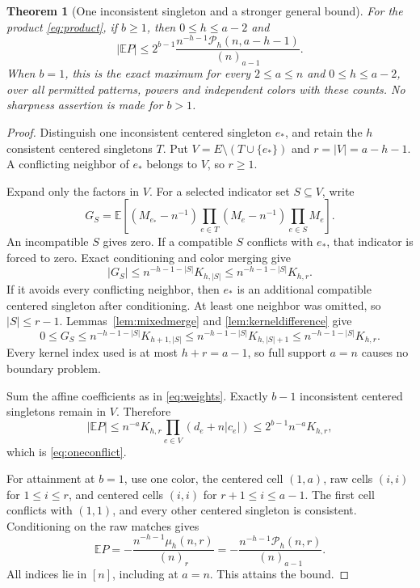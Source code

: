 \documentclass[11pt]{article}
\newtheorem{theorem}{Theorem}[section]
\theoremstyle{definition}
\theoremstyle{remark}
\newcommand{\E}{\mathbb E}
\newcommand{\1}{\mathbf 1}
\begin{document}
\begin{theorem}[One inconsistent singleton and a stronger general bound]\label{thm:oneconflict}
For the product \eqref{eq:product}, if $b\ge1$, then $0\le h\le a-2$ and
\begin{equation}\label{eq:oneconflict}
|\E P|\le
2^{b-1}\frac{n^{-h-1}\mathcal P_h(n,a-h-1)}{(n)_{a-1}}.
\end{equation}
When $b=1$, this is the exact maximum for every $2\le a\le n$ and $0\le h\le a-2$, over all permitted patterns, powers and independent colors with these counts. No sharpness assertion is made for $b>1$.
\end{theorem}
\begin{proof}
Distinguish one inconsistent centered singleton $e_*$, and retain the $h$ consistent centered singletons $T$. Put $V=E\setminus(T\cup\{e_*\})$ and $r=|V|=a-h-1$. A conflicting neighbor of $e_*$ belongs to $V$, so $r\ge1$.

Expand only the factors in $V$. For a selected indicator set $S\subseteq V$, write
\[
G_S=\E\left[(M_{e_*}-n^{-1})
\prod_{e\in T}(M_e-n^{-1})\prod_{e\in S}M_e\right].
\]
An incompatible $S$ gives zero. If a compatible $S$ conflicts with $e_*$, that indicator is forced to zero. Exact conditioning and color merging give
\[
|G_S|\le n^{-h-1-|S|}K_{h,|S|}\le n^{-h-1-|S|}K_{h,r}.
\]
If it avoids every conflicting neighbor, then $e_*$ is an additional compatible centered singleton after conditioning. At least one neighbor was omitted, so $|S|\le r-1$. Lemmas~\ref{lem:mixedmerge} and \ref{lem:kerneldifference} give
\[
0\le G_S\le n^{-h-1-|S|}K_{h+1,|S|}
\le n^{-h-1-|S|}K_{h,|S|+1}
\le n^{-h-1-|S|}K_{h,r}.
\]
Every kernel index used is at most $h+r=a-1$, so full support $a=n$ causes no boundary problem.

Sum the affine coefficients as in \eqref{eq:weights}. Exactly $b-1$ inconsistent centered singletons remain in $V$. Therefore
\[
|\E P|\le n^{-a}K_{h,r}
\prod_{e\in V}(d_e+n|c_e|)
\le2^{b-1}n^{-a}K_{h,r},
\]
which is \eqref{eq:oneconflict}.

For attainment at $b=1$, use one color, the centered cell $(1,a)$, raw cells $(i,i)$ for $1\le i\le r$, and centered cells $(i,i)$ for $r+1\le i\le a-1$. The first cell conflicts with $(1,1)$, and every other centered singleton is consistent. Conditioning on the raw matches gives
\[
\E P=-\frac{n^{-h-1}\mu_h(n,r)}{(n)_r}
=-\frac{n^{-h-1}\mathcal P_h(n,r)}{(n)_{a-1}}.
\]
All indices lie in $[n]$, including at $a=n$. This attains the bound.
\end{proof}
\end{document}
